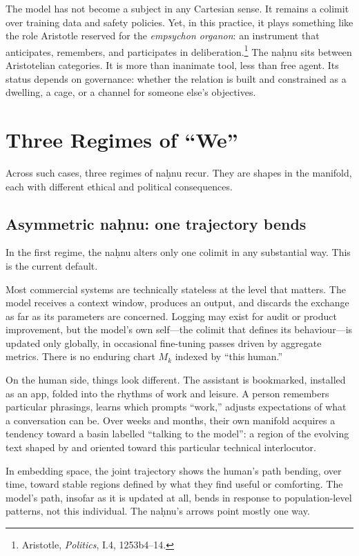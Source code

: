 The model has not become a subject in any Cartesian sense. It remains a colimit over training data and safety policies. Yet, in this practice, it plays something like the role Aristotle reserved for the \emph{empsychon organon}: an instrument that anticipates, remembers, and participates in deliberation.\footnote{Aristotle, \emph{Politics}, I.4, 1253b4--14.} The na\d{h}nu sits between Aristotelian categories. It is more than inanimate tool, less than free agent. Its status depends on governance: whether the relation is built and constrained as a dwelling, a cage, or a channel for someone else's objectives.

\section{Three Regimes of ``We''}

Across such cases, three regimes of na\d{h}nu recur. They are shapes in the manifold, each with different ethical and political consequences.

\subsection{Asymmetric na\d{h}nu: one trajectory bends}

In the first regime, the na\d{h}nu alters only one colimit in any substantial way. This is the current default.

Most commercial systems are technically stateless at the level that matters. The model receives a context window, produces an output, and discards the exchange as far as its parameters are concerned. Logging may exist for audit or product improvement, but the model's own self---the colimit that defines its behaviour---is updated only globally, in occasional fine-tuning passes driven by aggregate metrics. There is no enduring chart $M_k$ indexed by ``this human.''

On the human side, things look different. The assistant is bookmarked, installed as an app, folded into the rhythms of work and leisure. A person remembers particular phrasings, learns which prompts ``work,'' adjusts expectations of what a conversation can be. Over weeks and months, their own manifold acquires a tendency toward a basin labelled ``talking to the model'': a region of the evolving text shaped by and oriented toward this particular technical interlocutor.

In embedding space, the joint trajectory shows the human's path bending, over time, toward stable regions defined by what they find useful or comforting. The model's path, insofar as it is updated at all, bends in response to population-level patterns, not this individual. The na\d{h}nu's arrows point mostly one way.


